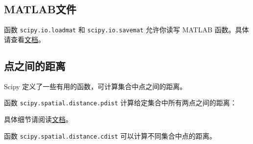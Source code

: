 \subsection{MATLAB文件}


函数 \lstinline|scipy.io.loadmat| 和 \lstinline|scipy.io.savemat| 允许你读写 MATLAB 函数。具体请查看\href{http://docs.scipy.org/doc/scipy/reference/io.html}{文档}。

\subsection{点之间的距离} %


Scipy 定义了一些有用的函数，可计算集合中点之间的距离。


函数 \lstinline|scipy.spatial.distance.pdist| 计算给定集合中所有两点之间的距离：


具体细节请阅读\href{http://docs.scipy.org/doc/scipy/reference/generated/scipy.spatial.distance.pdist.html}{文档}。

函数 \lstinline|scipy.spatial.distance.cdist| 可以计算不同集合中点的距离。


